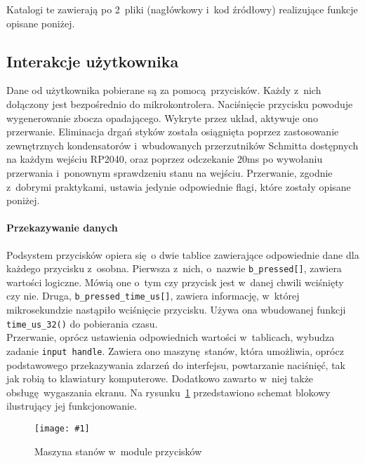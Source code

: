 \documentclass[polish]{aghengthesis}
\newcommand{\imgint}[4]{
	\begin{figure}[{#4}]
		\centering
		\texttt{[image: \#1]}
		\caption{#2}
		\label{#1}
	\end{figure}
}
\newcommand{\imgh}[3]{\imgint{#1}{#2}{#3}{H}}
\begin{document}
		Katalogi te zawierają po 2~pliki (nagłówkowy i~kod źródłowy) realizujące funkcje opisane poniżej.
		
		\subsection{Interakcje użytkownika}
			Dane od użytkownika pobierane są za pomocą przycisków. Każdy z~nich dołączony jest bezpośrednio do mikrokontrolera. Naciśnięcie przycisku powoduje wygenerowanie zbocza opadającego. Wykryte przez układ, aktywuje ono przerwanie. Eliminacja drgań styków została osiągnięta poprzez zastosowanie zewnętrznych kondensatorów i~wbudowanych przerzutników Schmitta dostępnych na każdym wejściu RP2040, oraz poprzez odczekanie 20ms po wywołaniu przerwania i~ponownym sprawdzeniu stanu na wejściu. Przerwanie, zgodnie z~dobrymi praktykami, ustawia jedynie odpowiednie flagi, które zostały opisane poniżej.
			
			\paragraph{Przekazywanie danych}
				Podsystem przycisków opiera się o dwie tablice zawierające odpowiednie dane dla każdego przycisku z~osobna. Pierwsza z~nich, o~nazwie \lstinline|b_pressed[]|, zawiera wartości logiczne. Mówią one o~tym czy przycisk jest w~danej chwili wciśnięty czy nie. Druga, \lstinline|b_pressed_time_us[]|, zawiera informację, w~której mikrosekundzie nastąpiło wciśnięcie przycisku. Używa ona wbudowanej funkcji \lstinline|time_us_32()| do pobierania czasu.
			$ $\\
			
			Przerwanie, oprócz ustawienia odpowiednich wartości w~tablicach, wybudza zadanie \lstinline|input handle|. Zawiera ono maszynę stanów, która umożliwia, oprócz podstawowego przekazywania zdarzeń do interfejsu, powtarzanie naciśnięć, tak jak robią to klawiatury komputerowe. Dodatkowo zawarto w~niej także obsługę wygaszania ekranu. Na rysunku~\ref{3/PicoRadio-buttons} przedstawiono schemat blokowy ilustrujący jej funkcjonowanie.
			
			\imgh{3/PicoRadio-buttons}{Maszyna stanów w~module przycisków}{0.75}
			
\end{document}

